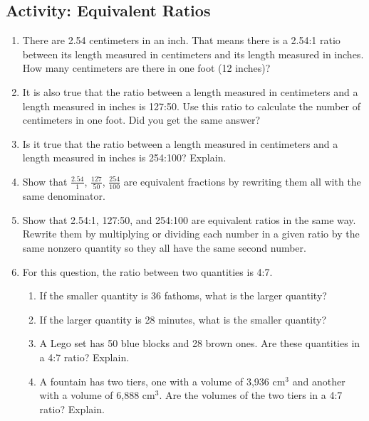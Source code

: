 \subsection{Activity: Equivalent Ratios}
\begin{enumerate}
\item There are 2.54 centimeters in an inch. That means there is a 2.54:1 ratio between its length measured in centimeters and its length measured in inches. How many centimeters are there in one foot (12 inches)?\wbvfill
\item It is also true that the ratio between a length measured in centimeters and a length measured in inches is 127:50. Use this ratio to calculate the number of centimeters in one foot. Did you get the same answer? \wbvfill
\item Is it true that the ratio between a length measured in centimeters and a length measured in inches is 254:100? Explain.\wbvfill
\item Show that $\frac{2.54}{1}$, $\frac{127}{50}$, $\frac{254}{100}$ are equivalent fractions by rewriting them all with the same denominator.\wbvfill
\item Show that 2.54:1, 127:50, and 254:100 are equivalent ratios in the same way. Rewrite them by multiplying or dividing each number in a given ratio by the same nonzero quantity so they all have the same second number.\wbvfill
\item For this question, the ratio between two quantities is 4:7.
\begin{enumerate}
\item If the smaller quantity is 36 fathoms, what is the larger quantity?\wbvfill
\item If the larger quantity is 28 minutes, what is the smaller quantity?\wbvfill
\item A Lego set has 50 blue blocks and 28 brown ones. Are these quantities in a 4:7 ratio? Explain. \wbvfill
\item A fountain has two tiers, one with a volume of 3,936 cm$^3$ and another with a volume of 6,888 cm$^3$. Are the volumes of the two tiers in a 4:7 ratio? Explain. \wbvfill
\end{enumerate}
\end{enumerate}


